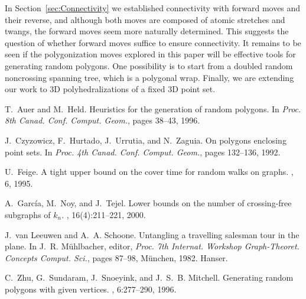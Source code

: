 \pdfoutput=1  \documentclass{article}
\newcommand{\secref}[1]{\ref{sec:#1}}
\begin{document}
In Section~\secref{Connectivity} we established connectivity with
forward moves and their reverse, and although both moves are
composed of atomic stretches and twangs, the forward moves seem more
naturally determined. 
This suggests the question of
whether forward moves
suffice to ensure
connectivity.
It remains to be seen if the polygonization moves explored in this
paper will be effective tools for generating random polygons.
One possibility is to start from a doubled random noncrossing spanning
tree, which is a polygonal wrap.
Finally, we are extending our work to 3D 
polyhedralizations of a fixed 3D point set.




\begin{thebibliography}{CHUZ92}

T.~Auer and M.~Held.
\newblock Heuristics for the generation of random polygons.
\newblock In {\em Proc. 8th Canad. Conf. Comput. Geom.}, pages 38--43, 1996.

J.~Czyzowicz, F.~Hurtado, J.~Urrutia, and N.~Zaguia.
\newblock On polygons enclosing point sets.
\newblock In {\em Proc. 4th Canad. Conf. Comput. Geom.}, pages 132--136, 1992.

U.~Feige.
\newblock A tight upper bound on the cover time for random walks on graphs.
, 6, 1995.

A.~Garc{\'i}a, M.~Noy, and J.~Tejel.
\newblock Lower bounds on the number of crossing-free subgraphs of $k_n$.
, 16(4):211--221, 2000.

J.~van Leeuwen and A.~A. Schoone.
\newblock Untangling a travelling salesman tour in the plane.
\newblock In J.~R. M{\"u}hlbacher, editor, {\em Proc. 7th Internat. Workshop
  Graph-Theoret. Concepts Comput. Sci.}, pages 87--98, M{\"u}nchen, 1982.
  Hanser.

C.~Zhu, G.~Sundaram, J.~Snoeyink, and J.~S.~B. Mitchell.
\newblock Generating random polygons with given vertices.
, 6:277--290, 1996.

\end{thebibliography}

\normalsize

\newpage
\end{document}
